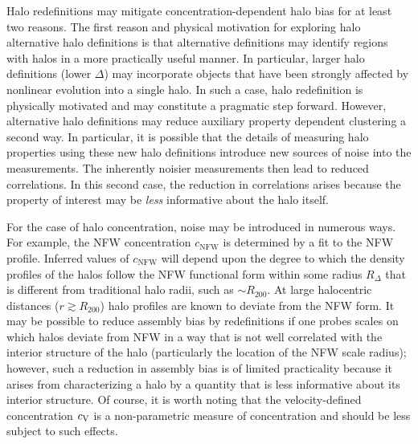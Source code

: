 \documentclass[usenatbib,fleqn]{mnras}
\begin{document}
Halo redefinitions may mitigate concentration-dependent halo bias for at least two reasons. The first reason and physical motivation for exploring halo alternative halo definitions is that alternative definitions may identify regions with halos in a more practically useful manner. In particular, larger halo definitions (lower $\Delta$) may incorporate objects that have been strongly affected by nonlinear evolution into a single halo. In such a case, halo redefinition is physically motivated and may constitute a pragmatic step forward. However, alternative halo definitions may reduce auxiliary property dependent clustering a second way. In particular, it is possible that the details of measuring halo properties using these new halo definitions introduce new sources of noise into the measurements. The inherently noisier measurements then lead to reduced correlations. In this second case, the reduction in correlations arises because the property of interest may be {\em less} informative about the halo itself.

For the case of halo concentration, noise may be introduced in numerous ways. For example, the NFW concentration $c_{\mathrm{NFW}}$ is determined by a fit to the 
NFW profile. Inferred values of $c_{\mathrm{NFW}}$ will depend upon 
the degree to which the density profiles of the halos follow the NFW 
functional form within some radius $R_{\Delta}$ that is different from 
traditional halo radii, such as $\sim R_{200}$. At large halocentric 
distances ($r \gtrsim R_{200}$) halo profiles are known to deviate 
from the NFW form. It may be possible to reduce assembly bias by redefinitions if one probes scales on which halos deviate from NFW in a way that is not well correlated with the interior structure of the halo (particularly the location of the NFW scale radius); however, such a reduction in assembly bias is of limited practicality because it arises from characterizing a halo by a quantity that is less informative about its interior structure. Of course, it is worth noting that the velocity-defined concentration $c_{\rm V}$ is a non-parametric measure of concentration and should be less subject to such effects. 
\end{document}
